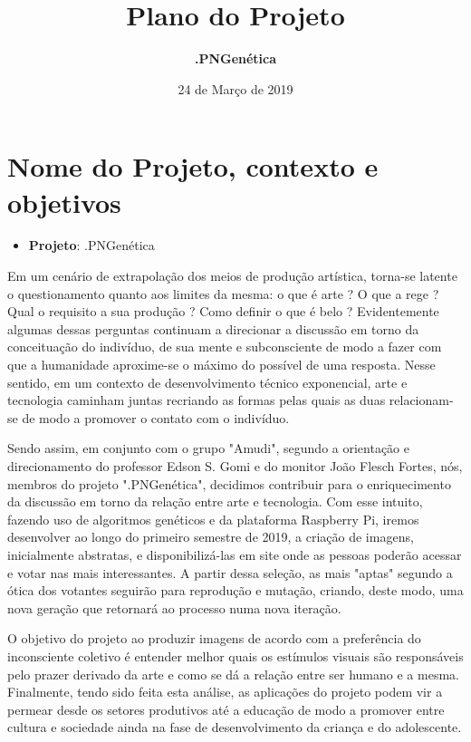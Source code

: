 \documentclass{article}
\title{\textbf{Plano do Projeto}}
\author{\textbf{.PNGenética}}
\date{24 de Março de 2019}
\begin{document}
	
	\maketitle
	
	\section{Nome do Projeto, contexto e objetivos}
	\begin{itemize}
		\item {\textbf{Projeto}}: .PNGenética \newline
	\end{itemize}
	
	Em um cenário de extrapolação dos meios de produção artística, torna-se latente o questionamento quanto aos limites da mesma: o que é arte ? O que a rege ? Qual o requisito a sua produção ? Como definir o que é belo ? Evidentemente algumas dessas perguntas continuam a direcionar a discussão em torno da conceituação do indivíduo, de sua mente e subconsciente de modo a fazer com que a humanidade aproxime-se o máximo do possível de uma resposta. Nesse sentido, em um contexto de desenvolvimento técnico exponencial, arte e tecnologia caminham juntas recriando as formas pelas quais as duas relacionam-se de modo a promover o contato com o indivíduo. \newline
	
	Sendo assim, em conjunto com o grupo "Amudi", segundo a orientação e direcionamento do professor Edson S. Gomi e do monitor João Flesch Fortes, nós, membros do projeto ".PNGenética", decidimos contribuir para o enriquecimento da discussão em torno da relação entre arte e tecnologia. Com esse intuito, fazendo uso de algoritmos genéticos e da plataforma Raspberry Pi, iremos desenvolver ao longo do primeiro semestre de 2019, a criação de imagens, inicialmente abstratas, e disponibilizá-las em site onde as pessoas poderão acessar e votar nas mais interessantes. A partir dessa seleção, as mais "aptas" segundo a ótica dos votantes seguirão para reprodução e mutação, criando, deste modo, uma nova geração que retornará ao processo numa nova iteração.\newline

	O objetivo do projeto ao produzir imagens de acordo com a preferência do inconsciente coletivo é entender melhor quais os estímulos visuais são responsáveis pelo prazer derivado da arte e como se dá a relação entre ser humano e a mesma. Finalmente, tendo sido feita esta análise, as aplicações do projeto podem vir a permear desde os setores produtivos até a educação de modo a promover entre cultura e sociedade ainda na fase de desenvolvimento da criança e do adolescente. 
	
\end{document}
